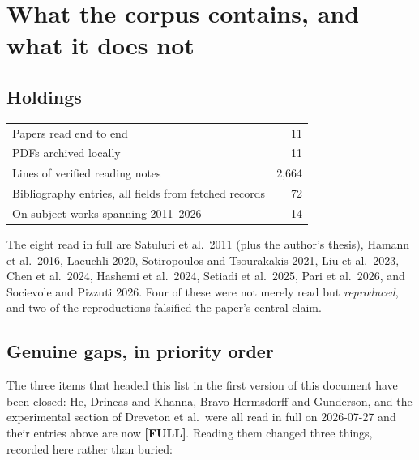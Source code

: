 \documentclass[10pt,a4paper]{article}
\begin{document}
\section{What the corpus contains, and what it does not}

\subsection*{Holdings}

\begin{center}
\begin{tabular}{@{}lr@{}}
\toprule
Papers read end to end & 11 \\
PDFs archived locally & 11 \\
Lines of verified reading notes & 2{,}664 \\
Bibliography entries, all fields from fetched records & 72 \\
On-subject works spanning 2011--2026 & 14 \\
\bottomrule
\end{tabular}
\end{center}

The eight read in full are Satuluri et al.\ 2011 (plus the author's thesis), Hamann et al.\ 2016,
Laeuchli 2020, Sotiropoulos and Tsourakakis 2021, Liu et al.\ 2023, Chen et al.\ 2024, Hashemi et
al.\ 2024, Setiadi et al.\ 2025, Pari et al.\ 2026, and Socievole and Pizzuti 2026. Four of these
were not merely read but \emph{reproduced}, and two of the reproductions falsified the paper's
central claim.

\subsection*{Genuine gaps, in priority order}

The three items that headed this list in the first version of this document have been closed:
He, Drineas and Khanna, Bravo-Hermsdorff and Gunderson, and the experimental section of Dreveton
et al.\ were all read in full on 2026-07-27 and their entries above are now \textbf{[FULL]}.
Reading them changed three things, recorded here rather than buried:
\end{document}
